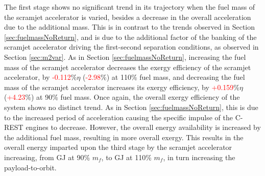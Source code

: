 The first stage shows no significant trend in its trajectory when the fuel mass of the scramjet accelerator is varied, besides a decrease in the overall acceleration due to the additional mass. This is in contrast to the trends observed in Section \ref{sec:fuelmassNoReturn}, and is due to the additional factor of the banking of the scramjet accelerator driving the first-second separation conditions, as observed in Section \ref{sec:m2var}.
As in Section \ref{sec:fuelmassNoReturn}, increasing the fuel mass of the scramjet accelerator decreases the exergy efficiency of the scramjet accelerator, by \textcolor{red}{-0.112}\%$\eta$ (\textcolor{red}{-2.98}\%) at 110\% fuel mass, and decreasing the fuel mass of the scramjet accelerator increases its exergy efficiency, by \textcolor{red}{+0.159}\%$\eta$ (\textcolor{red}{+4.23}\%) at 90\% fuel mass. Once again, the overall exergy efficiency of the system shows no distinct trend. 
As in Section \ref{sec:fuelmassNoReturn}, this is due to the increased period of acceleration causing the specific impulse of the C-REST engines to decrease. However, the overall energy availability is increased by the additional fuel mass, resulting in more overall exergy. This results in the overall energy imparted upon the third stage by the scramjet accelerator increasing, from \secondExergythirdStagemFuelNinety GJ at 90\% $m_{f}$, to \secondExergythirdStagemFuelOneHundredTen GJ at 110\% $m_{f}$, in turn increasing the payload-to-orbit.




